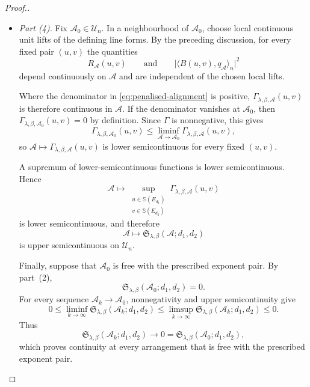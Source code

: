 \documentclass[pdflatex,sn-mathphys-num]{sn-jnl}%
\theoremstyle{remark}
\theoremstyle{definition}
\begin{document}
\begin{proof}[Proof.]
\begin{itemize}
\item \emph{Part (4).}
Fix $\mathcal{A}_0\in\mathcal U_n$. In a neighbourhood of $\mathcal{A}_0$,
choose local continuous unit lifts of the defining line forms. By the
preceding discussion, for every fixed pair $(u,v)$ the quantities
\[
R_{\mathcal{A}}(u,v)
\qquad\text{and}\qquad
\bigl|\langle B(u,v),q_{\mathcal{A}}\rangle_n\bigr|^2
\]
depend continuously on $\mathcal{A}$ and are independent of the chosen local
lifts.

Where the denominator in \eqref{eq:penalised-alignment} is positive,
$\Gamma_{\lambda,\beta,\mathcal{A}}(u,v)$ is therefore continuous in
$\mathcal{A}$. If the denominator vanishes at $\mathcal{A}_0$, then
$\Gamma_{\lambda,\beta,\mathcal{A}_0}(u,v)=0$ by definition. Since $\Gamma$ is
nonnegative, this gives
\[
\Gamma_{\lambda,\beta,\mathcal{A}_0}(u,v)
\leq
\liminf_{\mathcal{A}\to\mathcal{A}_0}
\Gamma_{\lambda,\beta,\mathcal{A}}(u,v),
\]
so $\mathcal{A}\mapsto
\Gamma_{\lambda,\beta,\mathcal{A}}(u,v)$ is lower semicontinuous for every
fixed $(u,v)$.

A supremum of lower-semicontinuous functions is lower semicontinuous. Hence
\[
\mathcal{A}
\longmapsto
\sup_{\substack{u\in\mathbb S(E_{d_1})\\
v\in\mathbb S(E_{d_2})}}
\Gamma_{\lambda,\beta,\mathcal{A}}(u,v)
\]
is lower semicontinuous, and therefore
\[
\mathcal{A}
\longmapsto
\mathfrak S_{\lambda,\beta}(\mathcal{A};d_1,d_2)
\]
is upper semicontinuous on $\mathcal U_n$.

Finally, suppose that $\mathcal{A}_0$ is free with the prescribed exponent
pair. By part~(2),
\[
\mathfrak S_{\lambda,\beta}(\mathcal{A}_0;d_1,d_2)=0.
\]
For every sequence $\mathcal{A}_k\to\mathcal{A}_0$, nonnegativity and upper
semicontinuity give
\[
0
\leq
\liminf_{k\to\infty}
\mathfrak S_{\lambda,\beta}(\mathcal{A}_k;d_1,d_2)
\leq
\limsup_{k\to\infty}
\mathfrak S_{\lambda,\beta}(\mathcal{A}_k;d_1,d_2)
\leq0.
\]
Thus
\[
\mathfrak S_{\lambda,\beta}(\mathcal{A}_k;d_1,d_2)
\longrightarrow0
=
\mathfrak S_{\lambda,\beta}(\mathcal{A}_0;d_1,d_2),
\]
which proves continuity at every arrangement that is free with the prescribed
exponent pair.


\end{itemize}
\end{proof}
\end{document}
